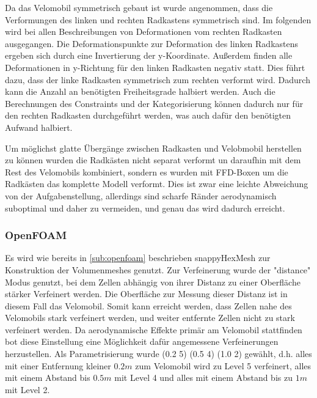 Da das Velomobil symmetrisch gebaut ist wurde angenommen, dass die Verformungen des linken und rechten Radkastens symmetrisch sind.
Im folgenden wird bei allen Beschreibungen von Deformationen vom rechten Radkasten ausgegangen.
Die Deformationspunkte zur Deformation des linken Radkastens ergeben sich durch eine Invertierung der y-Koordinate.
Außerdem finden alle Deformationen in y-Richtung für den linken Radkasten negativ statt.
Dies führt dazu, dass der linke Radkasten symmetrisch zum rechten verformt wird.
Dadurch kann die Anzahl an benötigten Freiheitsgrade halbiert werden. 
Auch die Berechnungen des Constraints und der Kategorisierung können dadurch nur für den rechten Radkasten durchgeführt werden, was auch dafür den benötigten Aufwand halbiert.

Um möglichst glatte Übergänge zwischen Radkasten und Velobmobil herstellen zu können wurden die Radkästen nicht separat verformt un daraufhin mit dem Rest des Velomobils kombiniert, sondern es wurden mit FFD-Boxen um die Radkästen das komplette Modell verformt.
Dies ist zwar eine leichte Abweichung von der Aufgabenstellung, allerdings sind scharfe Ränder aerodynamisch suboptimal und daher zu vermeiden, und genau das wird dadurch erreicht.

\subsubsection{OpenFOAM}

Es wird wie bereits in \cref{sub:openfoam} beschrieben snappyHexMesh zur Konstruktion der Volumenmeshes genutzt.
Zur Verfeinerung wurde der "distance" Modus genutzt, bei dem Zellen abhängig von ihrer Distanz zu einer Oberfläche stärker Verfeinert werden.
Die Oberfläche zur Messung dieser Distanz ist in diesem Fall das Velomobil.
Somit kann erreicht werden, dass Zellen nahe des Velomobils stark verfeinert werden, und weiter entfernte Zellen nicht zu stark verfeinert werden.
Da aerodynamische Effekte primär am Velomobil stattfinden bot diese Einstellung eine Möglichkeit dafür angemessene Verfeinerungen herzustellen.
Als Parametrisierung wurde (0.2 5) (0.5 4) (1.0 2) gewählt, d.h. alles mit einer Entfernung kleiner $0.2m$ zum Velomobil wird zu Level 5 verfeinert, alles mit einem Abstand bis $0.5m$ mit Level 4 und alles mit einem Abstand bis zu $1m$ mit Level 2.


